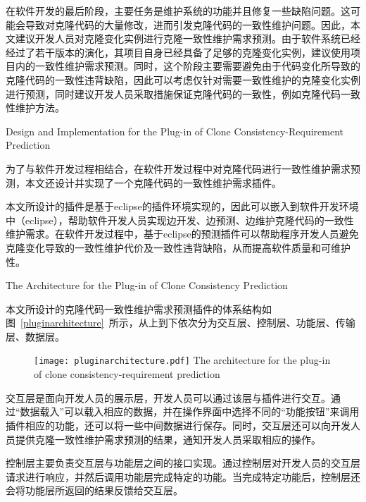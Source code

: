 在软件开发的最后阶段，主要任务是维护系统的功能并且修复一些缺陷问题。这可能会导致对克隆代码的大量修改，进而引发克隆代码的一致性维护问题。因此，本文建议开发人员对克隆变化实例进行克隆一致性维护需求预测。由于软件系统已经经过了若干版本的演化，其项目自身已经具备了足够的克隆变化实例，建议使用项目内的一致性维护需求预测。同时，这个阶段主要需要避免由于代码变化所导致的克隆代码的一致性违背缺陷，因此可以考虑仅针对需要一致性维护的克隆变化实例进行预测，同时建议开发人员采取措施保证克隆代码的一致性，例如克隆代码一致性维护方法\cite{cheng2016rule,nguyen2012clone}。



{Design and Implementation for the Plug-in of Clone Consistency-Requirement Prediction}

为了与软件开发过程相结合，在软件开发过程中对克隆代码进行一致性维护需求预测，本文还设计并实现了一个克隆代码的一致性维护需求插件。

本文所设计的插件是基于eclipse的插件环境实现的，因此可以嵌入到软件开发环境中（eclipse），帮助软件开发人员实现边开发、边预测、边维护克隆代码的一致性维护需求。在软件开发过程中，基于eclipse的预测插件可以帮助程序开发人员避免克隆变化导致的一致性维护代价及一致性违背缺陷，从而提高软件质量和可维护性。

{The Architecture for the Plug-in of Clone Consistency Prediction}

本文所设计的克隆代码一致性维护需求预测插件的体系结构如图~\ref{pluginarchitecture}~所示，从上到下依次分为交互层、控制层、功能层、传输层、数据层。

\begin{figure}[h]
\centering
\texttt{[image: pluginarchitecture.pdf]}
{The architecture for the plug-in of clone consistency-requirement prediction}
\vspace{-1em}
\end{figure}

交互层是面向开发人员的展示层，开发人员可以通过该层与插件进行交互。通过“数据载入”可以载入相应的数据，并在操作界面中选择不同的“功能按钮”来调用插件相应的功能，还可以将一些中间数据进行保存。同时，交互层还可以向开发人员提供克隆一致性维护需求预测的结果，通知开发人员采取相应的操作。

控制层主要负责交互层与功能层之间的接口实现。通过控制层对开发人员的交互层请求进行响应，并然后调用功能层完成特定的功能。当完成特定功能后，控制层还会将功能层所返回的结果反馈给交互层。

